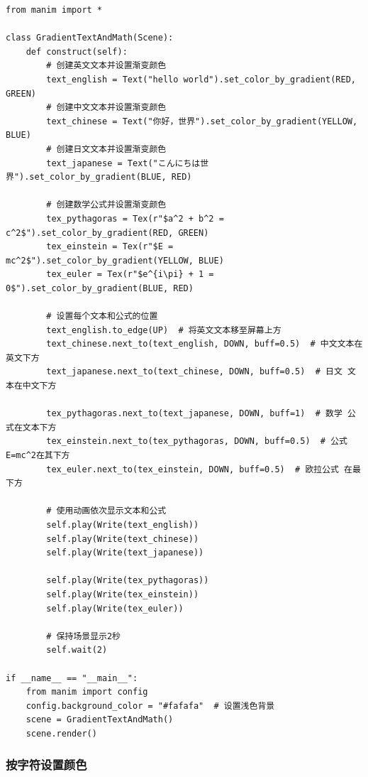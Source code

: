 \begin{lstlisting}[style=pythonstyle]
from manim import *

class GradientTextAndMath(Scene):
    def construct(self):
        # 创建英文文本并设置渐变颜色
        text_english = Text("hello world").set_color_by_gradient(RED, GREEN)
        # 创建中文文本并设置渐变颜色
        text_chinese = Text("你好，世界").set_color_by_gradient(YELLOW, BLUE)
        # 创建日文文本并设置渐变颜色
        text_japanese = Text("こんにちは世界").set_color_by_gradient(BLUE, RED)

        # 创建数学公式并设置渐变颜色
        tex_pythagoras = Tex(r"$a^2 + b^2 = c^2$").set_color_by_gradient(RED, GREEN)
        tex_einstein = Tex(r"$E = mc^2$").set_color_by_gradient(YELLOW, BLUE)
        tex_euler = Tex(r"$e^{i\pi} + 1 = 0$").set_color_by_gradient(BLUE, RED)

        # 设置每个文本和公式的位置
        text_english.to_edge(UP)  # 将英文文本移至屏幕上方
        text_chinese.next_to(text_english, DOWN, buff=0.5)  # 中文文本在英文下方
        text_japanese.next_to(text_chinese, DOWN, buff=0.5)  # 日文 文本在中文下方

        tex_pythagoras.next_to(text_japanese, DOWN, buff=1)  # 数学 公式在文本下方
        tex_einstein.next_to(tex_pythagoras, DOWN, buff=0.5)  # 公式E=mc^2在其下方
        tex_euler.next_to(tex_einstein, DOWN, buff=0.5)  # 欧拉公式 在最下方

        # 使用动画依次显示文本和公式
        self.play(Write(text_english))
        self.play(Write(text_chinese))
        self.play(Write(text_japanese))

        self.play(Write(tex_pythagoras))
        self.play(Write(tex_einstein))
        self.play(Write(tex_euler))

        # 保持场景显示2秒
        self.wait(2)

if __name__ == "__main__":
    from manim import config
    config.background_color = "#fafafa"  # 设置浅色背景
    scene = GradientTextAndMath()
    scene.render()
\end{lstlisting}

\subsubsection{按字符设置颜色}
\label{subsubsec:manim_text_formula_style_color_char}

